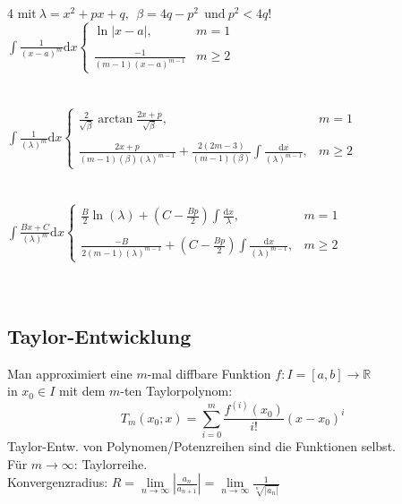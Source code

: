 \documentclass[6pt,a4paper]{scrartcl}
\newcommand{\abs}[1]{\ensuremath{\left\vert#1\right\vert}}
\newcommand{\ra}[0]{\ensuremath{\rightarrow}}
\begin{document}
\begin{multicols*}{4}
    $\text{mit} ~ \lambda=x^2+px+q, ~~ \beta=4q-p^2 ~~ \text{und} ~p^2<4q$!
    $\int\frac{1}{(x-a)^m}\mathrm dx \begin{cases} \ln\left|x-a\right|, & m=1\\ \\ \frac{-1}{(m-1)(x-a)^{m-1}} &m\geq2 \end{cases}$\\ \\ \\
    $\int\frac{1}{(\lambda)^m} \mathrm dx \begin{cases} \frac{2}{\sqrt{\beta}} \arctan\frac{2x+p}{\sqrt{\beta}}, &m=1\\ \\ \frac{2x+p}{(m-1)(\beta)(\lambda)^{m-1}}+\frac{2(2m-3)}{(m-1)(\beta)} \int\frac{\mathrm dx}{(\lambda)^{m-1}}, &m\geq2 \end{cases}$\\ \\ \\
    $\int\frac{Bx+C}{(\lambda)^m} \mathrm dx \begin{cases} \frac{B}{2} \ln(\lambda) + (C-\frac{Bp}{2}) \int\frac{\mathrm dx}{\lambda}, &m=1\\ \\ \frac{-B}{2(m-1)(\lambda)^{m-1}} + (C-\frac{Bp}{2}) \int\frac{\mathrm dx}{(\lambda)^{m-1}}, &m\geq2 \end{cases}$\\ \\ \\

    \subsection{Taylor-Entwicklung}
    Man approximiert eine $m$-mal diffbare Funktion $f:I=[a,b] \rightarrow \mathbb R$ \\ in $x_0 \in I$ mit dem $m$-ten Taylorpolynom:\\
    \begin{equation*}
        T_{m}(x_0;x)= \sum_{i=0}^{m} \frac{f^{(i)}(x_0)}{i!}(x-x_0)^i
    \end{equation*}
    Taylor-Entw. von Polynomen/Potenzreihen sind die Funktionen selbst.\\
    Für $m \ra \infty$: Taylorreihe. \\
    Konvergenzradius: $R = \underset{n\rightarrow \infty}{\lim} \abs{\frac{a_n}{a_{n+1}}}=\lim\limits_{n\rightarrow \infty}\frac{1}{\sqrt[n]{\abs{a_n}}}$


\end{multicols*}
\end{document}
